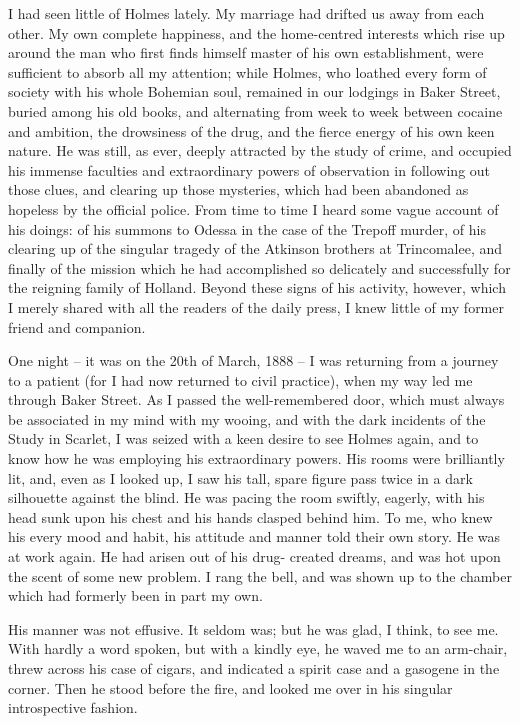 I had seen little of Holmes lately. My marriage had drifted
us away from each other. My own complete happiness, and
the home-centred interests which rise up around the man who
first finds himself master of his own establishment, were
sufficient to absorb all my attention; while Holmes, who loathed
every form of society with his whole Bohemian soul, remained
in our lodgings in Baker Street, buried among his old books,
and alternating from week to week between cocaine and ambition,
the drowsiness of the drug, and the fierce energy of
his own keen nature. He was still, as ever, deeply attracted
by the study of crime, and occupied his immense faculties
and extraordinary powers of observation in following out
those clues, and clearing up those mysteries, which had been
abandoned as hopeless by the official police. From time to
time I heard some vague account of his doings: of his summons
to Odessa in the case of the Trepoff murder, of his
clearing up of the singular tragedy of the Atkinson brothers
at Trincomalee, and finally of the mission which he had accomplished
so delicately and successfully for the reigning
family of Holland. Beyond these signs of his activity, however,
which I merely shared with all the readers of the daily
press, I knew little of my former friend and companion.

One night -- it was on the 20th of March, 1888 -- I was returning
from a journey to a patient (for I had now returned to
civil practice), when my way led me through Baker Street.
As I passed the well-remembered door, which must always be
associated in my mind with my wooing, and with the dark
incidents of the Study in Scarlet, I was seized with a keen
desire to see Holmes again, and to know how he was employing
his extraordinary powers. His rooms were brilliantly lit,
and, even as I looked up, I saw his tall, spare figure pass
twice in a dark silhouette against the blind. He was pacing
the room swiftly, eagerly, with his head sunk upon his chest
and his hands clasped behind him. To me, who knew his
every mood and habit, his attitude and manner told their own
story. He was at work again. He had arisen out of his drug-%
created dreams, and was hot upon the scent of some new
problem. I rang the bell, and was shown up to the chamber
which had formerly been in part my own.

His manner was not effusive. It seldom was; but he was
glad, I think, to see me. With hardly a word spoken, but
with a kindly eye, he waved me to an arm-chair, threw across
his case of cigars, and indicated a spirit case and a gasogene
in the corner. Then he stood before the fire, and looked me
over in his singular introspective fashion.

